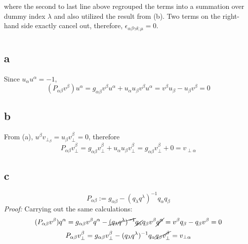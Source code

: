 \documentclass{article}
\begin{document}
where the second to last line above regrouped the terms into a summation over dummy index $\lambda$ and also utilized the result from (b). 
Two terms on the right-hand side exactly cancel out, therefore, $\epsilon_{\alpha\beta\gamma\delta;\mu}  = 0$.
\section{}
\subsection*{a}
Since $u_\alpha u^\alpha  = -1$,
\[
	(P_{\alpha\beta}v^\beta) u^\alpha = g_{\alpha\beta} v^\beta u^\alpha +  u_{\alpha}u_{\beta} v^\beta u^\alpha
	= v^\beta u_\beta - u_\beta v^\beta = 0
\]
\subsection*{b}
From (a), $u^\beta v_{\perp_\beta} = u_{\beta} v_{\perp}^\beta = 0$, therefore
\[
	P_{\alpha\beta}v_{\perp}^\beta =  g_{\alpha\beta} v_{\perp}^\beta +  u_{\alpha}u_{\beta} v_{\perp}^\beta
	=  g_{\alpha\beta} v_{\perp}^\beta +  0 = v_{\perp\alpha}
\]
\subsection*{c}
\[
	P_{\alpha\beta} := g_{\alpha\beta}  - ({q_\lambda q^\lambda})^{-1} q_{\alpha}q_{\beta}
\]
\textit{Proof:} Carrying out the same calculations:
\[  (P_{\alpha\beta}v^\beta) q^\alpha = g_{\alpha\beta} v^\beta q^\alpha - \cancel{({q_\lambda q^\lambda})^{-1}} \cancel{q_{\alpha}}q_{\beta} v^\beta \cancel{q^\alpha} = v^\beta q_\beta - q_\beta v^\beta = 0 \]
\[
	P_{\alpha\beta}v_{\perp}^\beta =  g_{\alpha\beta} v_{\perp}^\beta  - ({q_\lambda q^\lambda})^{-1} q_{\alpha}\cancel{q_{\beta}  v_{\perp}^\beta} = v_{\perp\alpha}
\]
\end{document}
